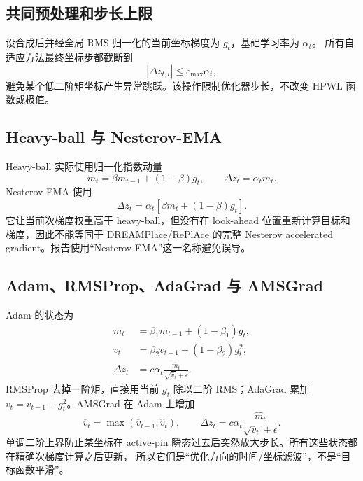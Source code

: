\documentclass[UTF8,fontset=windows,a4paper,11pt]{ctexart}
\begin{document}
\subsection{共同预处理和步长上限}

设合成后并经全局 RMS 归一化的当前坐标梯度为 $g_t$，基础学习率为 $\alpha_t$。
所有自适应方法最终坐标步都截断到
\begin{equation}
 |\Delta z_{t,i}|\leq c_{\max}\alpha_t,
\end{equation}
避免某个低二阶矩坐标产生异常跳跃。该操作限制优化器步长，不改变 HPWL 函数或极值。

\subsection{Heavy-ball 与 Nesterov-EMA}

Heavy-ball 实际使用归一化指数动量
\begin{equation}
 m_t=\beta m_{t-1}+(1-\beta)g_t,\qquad
 \Delta z_t=\alpha_t m_t.
\end{equation}
Nesterov-EMA 使用
\begin{equation}
 \Delta z_t=\alpha_t\left[\beta m_t+(1-\beta)g_t\right].
\end{equation}
它让当前次梯度权重高于 heavy-ball，但没有在 look-ahead 位置重新计算目标和梯度，因此不能等同于
DREAMPlace/RePlAce 的完整 Nesterov accelerated gradient。报告使用“Nesterov-EMA”这一名称避免误导。

\subsection{Adam、RMSProp、AdaGrad 与 AMSGrad}

Adam 的状态为
\begin{align}
 m_t&=\beta_1m_{t-1}+(1-\beta_1)g_t,\\
 v_t&=\beta_2v_{t-1}+(1-\beta_2)g_t^2,\\
 \Delta z_t&=c\alpha_t\frac{\widehat m_t}{\sqrt{\widehat v_t}+\epsilon}.
\end{align}
RMSProp 去掉一阶矩，直接用当前 $g_t$ 除以二阶 RMS；AdaGrad 累加
$v_t=v_{t-1}+g_t^2$。AMSGrad 在 Adam 上增加
\begin{equation}
 \overline v_t=\max(\overline v_{t-1},\widehat v_t),\qquad
 \Delta z_t=c\alpha_t\frac{\widehat m_t}{\sqrt{\overline v_t}+\epsilon}.
 \label{eq:amsgrad}
\end{equation}
单调二阶上界防止某坐标在 active-pin 瞬态过去后突然放大步长。所有这些状态都在精确次梯度计算之后更新，
所以它们是“优化方向的时间/坐标滤波”，不是“目标函数平滑”。
\end{document}
